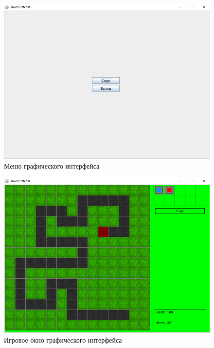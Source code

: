 \begin{figure}[H]
	\begin{center}
		\includegraphics[width=1\textwidth]{../image/menu.png}
		\caption{Меню графического интерфейса}
		\label{pic:gui_menu}
	\end{center}
\end{figure} 

\begin{figure}[H]
	\begin{center}
		\includegraphics[width=1\textwidth]{../image/GameScreen1.png}
		\caption{Игровое окно графического интерфейса}
		\label{pic:gui_screen1}
	\end{center}
\end{figure} 

